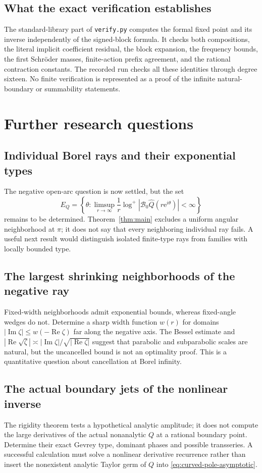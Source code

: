\documentclass[11pt,a4paper]{article}
\numberwithin{equation}{section}
\theoremstyle{definition}
\theoremstyle{remark}
\newcommand{\ee}{\mathrm e}
\newcommand{\Ree}{\operatorname{Re}}
\newcommand{\Imm}{\operatorname{Im}}
\newcommand{\B}{\mathcal B_0}
\newcommand{\Q}{\widehat Q}
\begin{document}
\subsection{What the exact verification establishes}
The standard-library part of \texttt{verify.py} computes the formal
fixed point and its inverse independently of the signed-block formula.
It checks both compositions, the literal implicit coefficient residual,
the block expansion, the frequency bounds, the first Schr\"oder masses,
finite-action prefix agreement, and the rational contraction constants.
The recorded run checks all these identities through degree sixteen.
No finite verification is represented as a proof of the infinite
natural-boundary or summability statements.

\section{Further research questions}
\label{sec:future}

\subsection{Individual Borel rays and their exponential types}
The negative open-arc question is now settled, but the set
\[
 E_Q=\left\{\theta:
   \limsup_{r\to\infty}\frac1r
       \log^+|\B\Q(r\ee^{i\theta})|<\infty\right\}
\]
remains to be determined.  Theorem~\ref{thm:main} excludes a uniform
angular neighborhood at $\pi$; it does not say that every neighboring
individual ray fails.  A useful next result would distinguish isolated
finite-type rays from families with locally bounded type.

\subsection{The largest shrinking neighborhoods of the negative ray}
Fixed-width neighborhoods admit exponential bounds, whereas fixed-angle
wedges do not.  Determine a sharp width function $w(r)$ for domains
$|\Imm\zeta|\le w(-\Ree\zeta)$ far along the negative axis.
The Bessel estimate and
$|\Ree\sqrt\zeta|\asymp |\Imm\zeta|/\sqrt{|\Ree\zeta|}$ suggest
that parabolic and subparabolic scales are natural, but the uncancelled
bound is not an optimality proof.  This is a quantitative question about
cancellation at Borel infinity.

\subsection{The actual boundary jets of the nonlinear inverse}
The rigidity theorem tests a hypothetical analytic amplitude; it does
not compute the large derivatives of the actual nonanalytic $Q$ at a
rational boundary point.  Determine their exact Gevrey type, dominant
phases and possible transseries.  A successful calculation must solve a
nonlinear derivative recurrence rather than insert the nonexistent
analytic Taylor germ of $Q$ into
\eqref{eq:curved-pole-asymptotic}.
\end{document}
